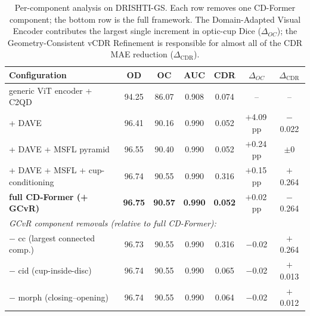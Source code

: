 \begin{table}[t]
\centering
\caption{Per-component analysis on DRISHTI-GS. Each row removes one CD-Former
component; the bottom row is the full framework. The Domain-Adapted Visual Encoder
contributes the largest single increment in optic-cup Dice ($\Delta_{OC}$);
the Geometry-Consistent vCDR Refinement is responsible for almost all of the
CDR MAE reduction ($\Delta_{\text{CDR}}$).}
\label{tab:ablation}
\setlength{\tabcolsep}{6pt}
\renewcommand{\arraystretch}{1.15}
\begin{tabular}{lcccccc}
\toprule
\textbf{Configuration} & \textbf{OD} & \textbf{OC} & \textbf{AUC} & \textbf{CDR} & $\Delta_{OC}$ & $\Delta_{\text{CDR}}$ \\
\midrule
generic ViT encoder + C2QD               & 94.25 & 86.07 & 0.908 & 0.074 & --        & --    \\
\quad + DAVE                              & 96.41 & 90.16 & 0.990 & 0.052 & $+$4.09\,pp & $-$0.022 \\
\quad + DAVE + MSFL pyramid               & 96.55 & 90.40 & 0.990 & 0.052 & $+$0.24\,pp & $\pm$0    \\
\quad + DAVE + MSFL + cup-conditioning    & 96.74 & 90.55 & 0.990 & 0.316 & $+$0.15\,pp & $+$0.264 \\
\rowcolor{ourrow}
\textbf{\textcolor{ourbold}{full CD-Former (+ GCvR)}} & \textbf{96.75} & \textbf{90.57} & \textbf{0.990} & \textbf{0.052} & $+$0.02\,pp & $-$0.264 \\
\midrule
\multicolumn{7}{l}{\textit{GCvR component removals (relative to full CD-Former):}} \\
\quad $-$ cc (largest connected comp.)    & 96.73 & 90.55 & 0.990 & 0.316 & $-$0.02   & $+$0.264 \\
\quad $-$ cid (cup-inside-disc)           & 96.74 & 90.55 & 0.990 & 0.065 & $-$0.02   & $+$0.013 \\
\quad $-$ morph (closing--opening)        & 96.74 & 90.55 & 0.990 & 0.064 & $-$0.02   & $+$0.012 \\
\bottomrule
\end{tabular}
\end{table}


